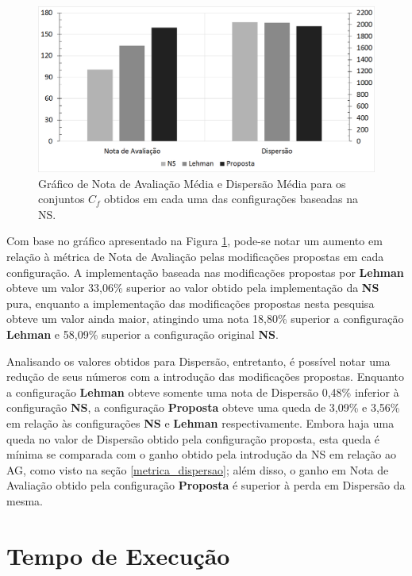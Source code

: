 \begin{figure}[htb]
	\begin{center}
		\includegraphics[width=1\textwidth]{Imagens/test_cf_compare.png}
		\caption{Gráfico de Nota de Avaliação Média e Dispersão Média para os conjuntos $C_f$ obtidos em cada uma das configurações baseadas na NS.}
		\label{fig:test_cf_compare}
	\end{center}
\end{figure}

Com base no gráfico apresentado na Figura \ref{fig:test_cf_compare}, pode-se notar um aumento em relação à métrica de Nota de Avaliação pelas modificações propostas em cada configuração. A implementação baseada nas modificações propostas por \textbf{Lehman} obteve um valor 33,06\% superior ao valor obtido pela implementação da \textbf{NS} pura, enquanto a implementação das modificações propostas nesta pesquisa obteve um valor ainda maior, atingindo uma nota 18,80\% superior a configuração \textbf{Lehman} e 58,09\% superior a configuração original \textbf{NS}.

Analisando os valores obtidos para Dispersão, entretanto, é possível notar uma redução de seus números com a introdução das modificações propostas. Enquanto a configuração \textbf{Lehman} obteve somente uma nota de Dispersão 0,48\% inferior à configuração \textbf{NS}, a configuração \textbf{Proposta} obteve uma queda de 3,09\% e 3,56\% em relação às configurações \textbf{NS} e \textbf{Lehman} respectivamente. Embora haja uma queda no valor de Dispersão obtido pela configuração proposta, esta queda é mínima se comparada com o ganho obtido pela introdução da NS em relação ao AG, como visto na seção \ref{metrica_dispersao}; além disso, o ganho em Nota de Avaliação obtido pela configuração \textbf{Proposta} é superior à perda em Dispersão da mesma.

\section{Tempo de Execução}
\label{tempo_de_execucao}


